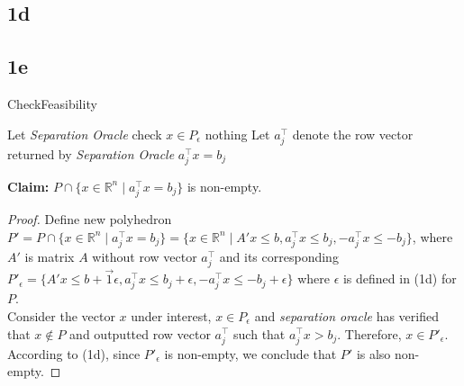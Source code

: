 \documentclass{article}
\begin{document}



\subsection*{1d}
\subsection*{1e}\begin{algorithm}[H]
\caption{{\sc CheckFeasibility}}
\begin{algorithmic}[1]
\State Let {\em Separation Oracle} check $x\in P_{\epsilon}$
\Return nothing
\Else
\State Let $a_j^{\intercal}$ denote the row vector returned by {\em Separation Oracle}
\State \Return $a_j^{\intercal}x = b_j$
\EndIf
\end{algorithmic}
\end{algorithm}
\textbf{Claim:} $P\cap \{x\in\mathbb{R}^n\mid a_j^{\intercal}x = b_j\}$ is non-empty.
\begin{proof}
  Define new polyhedron $P' = P\cap \{x\in\mathbb{R}^n\mid a_j^{\intercal}x = b_j\} =
  \{x\in\mathbb{R}^n\mid A'x \leq b, a_j^{\intercal}x \leq b_j, -a_j^{\intercal}x \leq -b_j \}$,
  where $A'$ is matrix $A$ without row vector $a_j^{\intercal}$ and its corresponding $P'_{\epsilon} = \{A'x\leq b + \vec{1}\epsilon, a_j^{\intercal}x \leq b_j + \epsilon, -a_j^{\intercal}x \leq -b_j + \epsilon\}$ where $\epsilon$ is defined in (1d) for $P$. \\
  Consider the vector $x$ under interest, $x\in P_{\epsilon}$ and {\em separation oracle}
  has verified that $x\notin P$ and outputted row vector $a_j^{\intercal}$ such that $a_j^{\intercal}x > b_j$. Therefore, $x\in P'_{\epsilon}$. According to (1d), since $P'_{\epsilon}$ is non-empty, we conclude that $P'$ is also non-empty. 
\end{proof}
\end{document}
